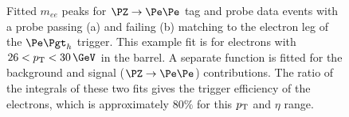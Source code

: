 \begin{figure}[htb]
\caption[Fitted $m_{ee}$ peaks for $\PZ\to\Pe\Pe$ tag and probe data events with
a probe passing or failing matching to the electron leg of the $\etau$ trigger.]
{Fitted $m_{ee}$ peaks for $\PZ\to\Pe\Pe$ tag and probe data events with a probe passing (a) and
failing (b) matching to the electron leg of the $\etau$ trigger. This example
fit is for electrons with $26 <\pt< 30\,\GeV$ in the barrel. A separate function is fitted for the
background and signal ($\PZ\to\Pe\Pe$) contributions. The ratio of the integrals
of these two fits gives the trigger efficiency of the electrons, which is
approximately $80\%$ for this $p_{\mathrm{T}}$ and $\eta$ range.}
\label{fig:tandp}
\end{figure}


